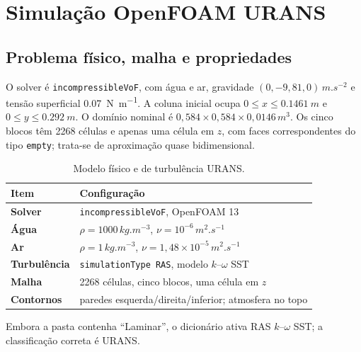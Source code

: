 \documentclass[12pt,a4paper]{article}
\newcommand{\code}[1]{\texttt{#1}}
\begin{document}
\section{Simulação OpenFOAM URANS}
\subsection{Problema físico, malha e propriedades}
O solver é \code{incompressibleVoF}, com água e ar, gravidade $(0,-9{,}81,0)\,\si{m.s^{-2}}$ e tensão superficial \SI{0.07}{N.m^{-1}}. A coluna inicial ocupa $0\le x\le\SI{0.1461}{m}$ e $0\le y\le\SI{0.292}{m}$. O domínio nominal é $0{,}584\times0{,}584\times0{,}0146\,\si{m^3}$. Os cinco blocos têm 2268 células e apenas uma célula em $z$, com faces correspondentes do tipo \code{empty}; trata-se de aproximação quase bidimensional.

\begin{table}[H]\centering
\caption{Modelo físico e de turbulência URANS.}\label{tab:fisica}
\begin{tabularx}{\textwidth}{>{\bfseries}l X}
\toprule Item & Configuração\\\midrule
Solver & \code{incompressibleVoF}, OpenFOAM 13\\
Água & $\rho=1000\,\si{kg.m^{-3}}$, $\nu=10^{-6}\,\si{m^2.s^{-1}}$\\
Ar & $\rho=1\,\si{kg.m^{-3}}$, $\nu=1{,}48\times10^{-5}\,\si{m^2.s^{-1}}$\\
Turbulência & \code{simulationType RAS}, modelo $k$--$\omega$ SST\\
Malha & 2268 células, cinco blocos, uma célula em $z$\\
Contornos & paredes esquerda/direita/inferior; atmosfera no topo\\
\bottomrule\end{tabularx}\end{table}
Embora a pasta contenha ``Laminar'', o dicionário ativa RAS $k$--$\omega$ SST; a classificação correta é URANS.
\end{document}
